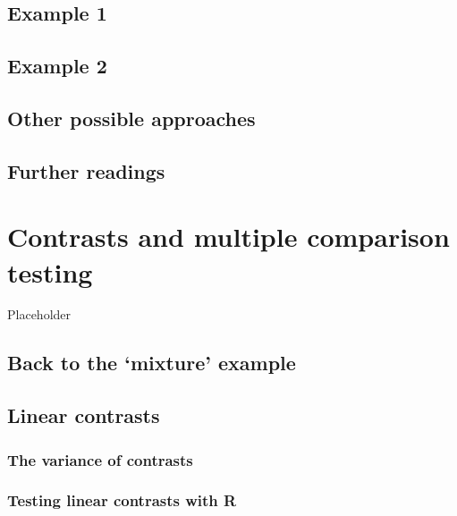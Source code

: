 \documentclass[a4paper,12pt,oneside]{book}
\begin{document}
\hypertarget{example-1}{%
\section{Example 1}\label{example-1}}

\hypertarget{example-2}{%
\section{Example 2}\label{example-2}}

\hypertarget{other-possible-approaches}{%
\section{Other possible approaches}\label{other-possible-approaches}}

\hypertarget{further-readings-6}{%
\section{Further readings}\label{further-readings-6}}

\hypertarget{contrasts-and-multiple-comparison-testing}{%
\chapter{Contrasts and multiple comparison testing}\label{contrasts-and-multiple-comparison-testing}}

Placeholder

\hypertarget{back-to-the-mixture-example}{%
\section{Back to the `mixture' example}\label{back-to-the-mixture-example}}

\hypertarget{linear-contrasts}{%
\section{Linear contrasts}\label{linear-contrasts}}

\hypertarget{the-variance-of-contrasts}{%
\subsection{The variance of contrasts}\label{the-variance-of-contrasts}}

\hypertarget{testing-linear-contrasts-with-r}{%
\subsection{Testing linear contrasts with R}\label{testing-linear-contrasts-with-r}}
\end{document}
